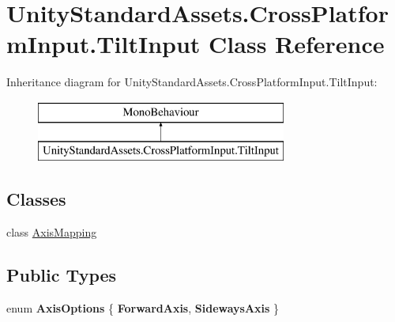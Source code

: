 \hypertarget{class_unity_standard_assets_1_1_cross_platform_input_1_1_tilt_input}{}\section{Unity\+Standard\+Assets.\+Cross\+Platform\+Input.\+Tilt\+Input Class Reference}
\label{class_unity_standard_assets_1_1_cross_platform_input_1_1_tilt_input}
Inheritance diagram for Unity\+Standard\+Assets.\+Cross\+Platform\+Input.\+Tilt\+Input\+:\begin{figure}[H]
\begin{center}
\leavevmode
\includegraphics[height=2.000000cm]{class_unity_standard_assets_1_1_cross_platform_input_1_1_tilt_input}
\end{center}
\end{figure}
\subsection*{Classes}
\begin{DoxyCompactItemize}
\item 
class \hyperlink{class_unity_standard_assets_1_1_cross_platform_input_1_1_tilt_input_1_1_axis_mapping}{Axis\+Mapping}
\end{DoxyCompactItemize}
\subsection*{Public Types}
\begin{DoxyCompactItemize}
\item 
\mbox{\label{class_unity_standard_assets_1_1_cross_platform_input_1_1_tilt_input_a33494fd997ae63aea22ffb585244f187}} 
enum {\bfseries Axis\+Options} \{ {\bfseries Forward\+Axis}, 
{\bfseries Sideways\+Axis}
 \}
\end{DoxyCompactItemize}
